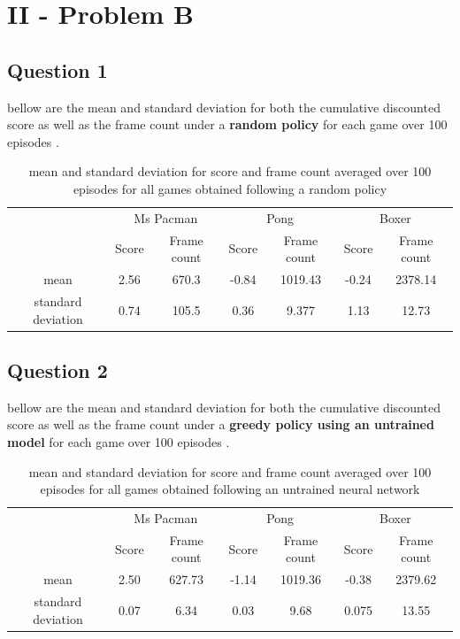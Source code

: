 \documentclass{report}
\begin{document}
\newpage

\section*{II - Problem B}

\subsection*{Question 1}

bellow are the mean and standard deviation for both the cumulative discounted score as well as the frame count under a \textbf{random policy} for each game  over 100 episodes .  \\

\begin{table}[H]
\centering
\label{b1Tab}
\begin{tabular}{c|c|c|c|c|c|c|}
\cline{2-7}
& \multicolumn{2}{c|}{Ms Pacman} & \multicolumn{2}{c|}{Pong} & \multicolumn{2}{c|}{Boxer} \\ 
\cline{2-7}  & Score       & Frame count      & Score    & Frame count & Score  & Frame count    \\ \hline
\multicolumn{1}{|c|}{mean}     &  2.56 & 670.3   &  -0.84  & 1019.43  & -0.24   &  2378.14  \\ \hline
\multicolumn{1}{|c|}{standard deviation} &  0.74  &  105.5 &     0.36      &    9.377   &       1.13    & 12.73  \\ \hline
\end{tabular}
\caption{mean and standard deviation for score and frame count averaged over 100 episodes for all games obtained following a random policy}
\end{table}

\subsection*{Question 2}


bellow are the mean and standard deviation for both the cumulative discounted score as well as the frame count under a \textbf{greedy policy using an untrained model} for each game  over 100 episodes .  \\
\begin{table}[H]
\centering
\caption{mean and standard deviation for score and frame count averaged over 100 episodes for all games obtained following an untrained neural network}
\label{b2Tab}
\begin{tabular}{c|c|c|c|c|c|c|}
\cline{2-7}
& \multicolumn{2}{c|}{Ms Pacman} & \multicolumn{2}{c|}{Pong} & \multicolumn{2}{c|}{Boxer} \\ 
\cline{2-7}  & Score       & Frame count      & Score    & Frame count & Score  & Frame count    \\ \hline
\multicolumn{1}{|c|}{mean}     &  2.50 & 627.73   &  -1.14  & 1019.36  &  -0.38  &  2379.62  \\ \hline
\multicolumn{1}{|c|}{standard deviation} &  0.07  &  6.34  &     0.03      &    9.68   &        0.075    & 13.55  \\ \hline
\end{tabular}
\end{table}
\end{document}
